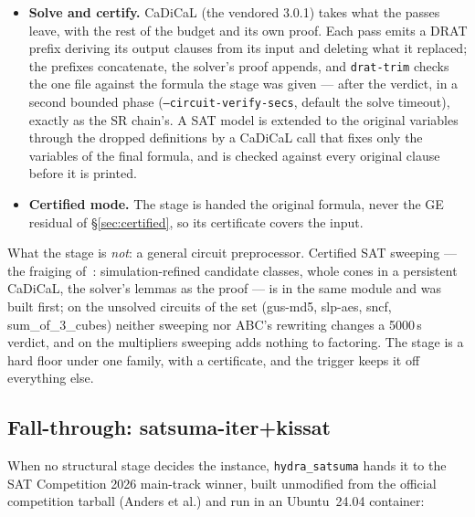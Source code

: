 \documentclass[10pt]{article}
\begin{document}
\begin{itemize}
  gives the solver~\cite{een07} --- a multiplexer is four clauses, not
  six, and a cover spans the gates inside a cut --- and it is where most
  of the gain lives: factoring
  alone refutes gm16spwtrc in 3{,}071\,s, factoring then cuts in
  1{,}423\,s.
\item \textbf{Solve and certify.} CaDiCaL (the vendored 3.0.1) takes
  what the passes leave, with the rest of the budget and its own proof.
  Each pass emits a DRAT prefix deriving its output clauses from its
  input and deleting what it replaced; the prefixes concatenate, the
  solver's proof appends, and \texttt{drat-trim} checks the one file
  against the formula the stage was given --- after the verdict, in a
  second bounded phase (\texttt{--circuit-verify-secs}, default the
  solve timeout), exactly as the SR chain's. A SAT model is extended to
  the original variables through the dropped definitions by a CaDiCaL
  call that fixes only the variables of the final formula, and is
  checked against every original clause before it is printed.
\item \textbf{Certified mode.} The stage is handed the original
  formula, never the GE residual of \S\ref{sec:certified}, so its
  certificate covers the input.
\end{itemize}

What the stage is \emph{not}: a general circuit preprocessor. Certified
SAT sweeping --- the fraiging of~\cite{fraig}: simulation-refined
candidate classes, whole cones in a persistent CaDiCaL, the solver's
lemmas as the proof --- is in the same module and was built first; on the unsolved circuits of the set
(gus-md5, slp-aes, sncf, sum\_of\_3\_cubes) neither sweeping nor
ABC's rewriting changes a 5000\,s verdict, and on the multipliers
sweeping adds nothing to factoring. The stage is a hard floor under one
family, with a certificate, and the trigger keeps it off everything
else.

\subsection{Fall-through: satsuma-iter+kissat}
\label{sec:satsuma}

When no structural stage decides the instance, \texttt{hydra\_satsuma}
hands it to the SAT Competition 2026 main-track winner, built
unmodified from the official competition tarball (Anders et al.) and
run in an Ubuntu~24.04 container:
\end{document}
